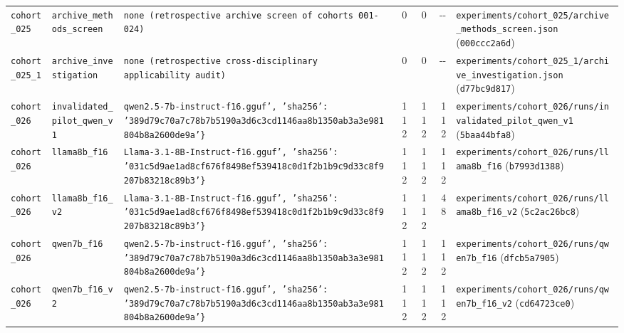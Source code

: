 {\begin{longtable}{@{}>{\raggedright\arraybackslash}p{1.5cm}>{\raggedright\arraybackslash}p{2.7cm}>{\raggedright\arraybackslash}p{3.2cm}rrr>{\raggedright\arraybackslash}p{4.2cm}@{}}
\texttt{cohort\_025} & \texttt{archive\_methods\_screen} & \texttt{none (retrospective archive screen of cohorts 001-\allowbreak{}024)} & 0 & 0 & -\allowbreak{}-\allowbreak{} & \texttt{experiments/\allowbreak{}cohort\_025/\allowbreak{}archive\_methods\_screen.json} (\texttt{000ccc2a6d}) \\
\texttt{cohort\_025\_1} & \texttt{archive\_investigation} & \texttt{none (retrospective cross-\allowbreak{}disciplinary applicability audit)} & 0 & 0 & -\allowbreak{}-\allowbreak{} & \texttt{experiments/\allowbreak{}cohort\_025\_1/\allowbreak{}archive\_investigation.json} (\texttt{d77bc9d817}) \\
\texttt{cohort\_026} & \texttt{invalidated\_pilot\_qwen\_v1} & \texttt{qwen2.5-\allowbreak{}7b-\allowbreak{}instruct-\allowbreak{}f16.gguf', 'sha256': '389d79c70a7c78b7b5190a3d6c3cd1146aa8b1350ab3a3e981804b8a2600de9a'\}} & 112 & 112 & 112 & \texttt{experiments/\allowbreak{}cohort\_026/\allowbreak{}runs/\allowbreak{}invalidated\_pilot\_qwen\_v1} (\texttt{5baa44bfa8}) \\
\texttt{cohort\_026} & \texttt{llama8b\_f16} & \texttt{Llama-\allowbreak{}3.1-\allowbreak{}8B-\allowbreak{}Instruct-\allowbreak{}f16.gguf', 'sha256': '031c5d9ae1ad8cf676f8498ef539418c0d1f2b1b9c9d33c8f9207b83218c89b3'\}} & 112 & 112 & 112 & \texttt{experiments/\allowbreak{}cohort\_026/\allowbreak{}runs/\allowbreak{}llama8b\_f16} (\texttt{b7993d1388}) \\
\texttt{cohort\_026} & \texttt{llama8b\_f16\_v2} & \texttt{Llama-\allowbreak{}3.1-\allowbreak{}8B-\allowbreak{}Instruct-\allowbreak{}f16.gguf', 'sha256': '031c5d9ae1ad8cf676f8498ef539418c0d1f2b1b9c9d33c8f9207b83218c89b3'\}} & 112 & 112 & 48 & \texttt{experiments/\allowbreak{}cohort\_026/\allowbreak{}runs/\allowbreak{}llama8b\_f16\_v2} (\texttt{5c2ac26bc8}) \\
\texttt{cohort\_026} & \texttt{qwen7b\_f16} & \texttt{qwen2.5-\allowbreak{}7b-\allowbreak{}instruct-\allowbreak{}f16.gguf', 'sha256': '389d79c70a7c78b7b5190a3d6c3cd1146aa8b1350ab3a3e981804b8a2600de9a'\}} & 112 & 112 & 112 & \texttt{experiments/\allowbreak{}cohort\_026/\allowbreak{}runs/\allowbreak{}qwen7b\_f16} (\texttt{dfcb5a7905}) \\
\texttt{cohort\_026} & \texttt{qwen7b\_f16\_v2} & \texttt{qwen2.5-\allowbreak{}7b-\allowbreak{}instruct-\allowbreak{}f16.gguf', 'sha256': '389d79c70a7c78b7b5190a3d6c3cd1146aa8b1350ab3a3e981804b8a2600de9a'\}} & 112 & 112 & 112 & \texttt{experiments/\allowbreak{}cohort\_026/\allowbreak{}runs/\allowbreak{}qwen7b\_f16\_v2} (\texttt{cd64723ce0}) \\

\end{longtable}}
